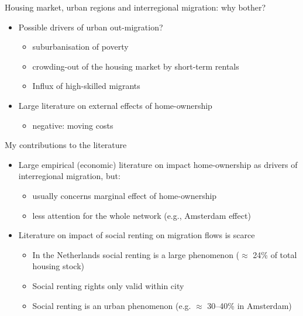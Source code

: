 \documentclass{beamer}
\begin{document}
\begin{frame}{Housing market, urban regions and interregional migration: why bother?}
  \begin{itemize}
	\item Possible drivers of urban out-migration?
	  \begin{itemize}
		\item \alert{suburbanisation} of poverty \citep{hochstenbach2018gentrification}
		\item \alert{crowding-out} of the housing market by short-term rentals
		  \citep{koster2021short}
		\item \alert{Influx} of high-skilled migrants
		  \citep{beckers2019residential}\newline \pause
\end{itemize}
   		\item Large literature on \alert{external} effects of home-ownership \citep{dietz2003social}
   		\begin{itemize}
   			\item \alert{negative}: moving costs \citep{oswald1996conjecture,oswald1999housing}
   		\end{itemize}
  \end{itemize}
\end{frame}



\begin{frame}{My contributions to the literature}
  \begin{itemize}
  \item Large empirical (economic) literature on impact home-ownership as drivers of interregional migration, but:
    \begin{itemize}
    \item usually concerns \alert{marginal} effect of home-ownership
    \item less attention for the whole \alert{network} (e.g., Amsterdam effect)\newline
    \end{itemize}
  \item Literature on impact of social renting on migration flows is
    scarce \footnotesize{\citep{de2009homeownership} }
	\begin{itemize}
        \item In the Netherlands social renting is a large phenomenon
          ($\approx$ 24\% of total housing stock)
        \item Social renting rights only valid \alert{within} city
        \item Social renting is an \alert{urban} phenomenon (e.g. $\approx$
          30--40\% in Amsterdam) 
        \end{itemize}
\end{itemize}
\end{frame}
\end{document}
